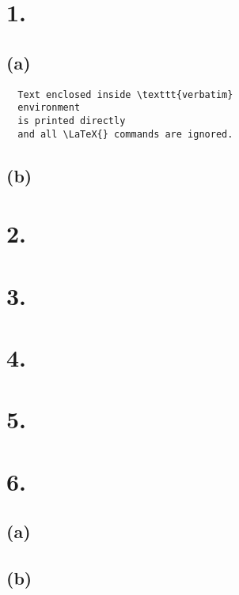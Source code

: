 \documentclass{article}
\begin{document}
\thispagestyle{firstpageheader}

\section*{1.}
{\Large 

\subsection*{(a)}

\begin{verbatim}
  Text enclosed inside \texttt{verbatim}
  environment 
  is printed directly 
  and all \LaTeX{} commands are ignored.
\end{verbatim}

\subsection*{(b)}


}

\section*{2.}
{\Large



}

\section*{3.}
{\Large 



}

\section*{4.}
{\Large 



}

\section*{5.}
{\Large 



}

\section*{6.}
{\Large 

\subsection*{(a)}

\subsection*{(b)}

}
\end{document}
